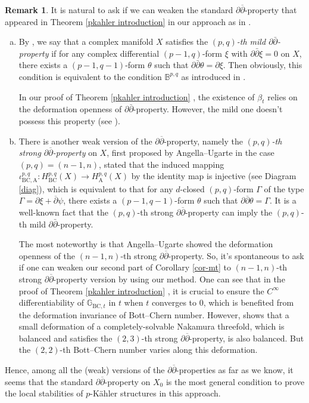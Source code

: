 \documentclass[12pt]{amsart}
\numberwithin{equation}{section}
\theoremstyle{definition}
\theoremstyle{definition}
\theoremstyle{definition}
\newtheorem{remark}  [theorem]     {Remark}
\renewcommand{\1}{\mathsf{1}}
\newcommand{\G}{\mathbb{G}}
\newcommand{\db}{\overline{\partial}}
\renewcommand{\>}{\rightarrow}
\newcommand{\p}{\partial}
\newcommand{\bp}{\overline\partial}
\def\p{\partial}
\def\b{\bar}
\theoremstyle{plain} %
\theoremstyle{plain} %
\theoremstyle{plain} %
\begin{document}
	\begin{remark}\label{weaken remark}
		It is natural to ask if we can weaken the standard $\p\bp$-property  that appeared in Theorem \ref{pkahler introduction}  in our approach as in \cite[Theorem 1.1]{RWZ19}.
		
		\begin{enumerate}[(a)]
			\item By \cite[Definition 3.1]{RWZ19},  we say that a complex manifold $X$ satisfies the  \textit{$(p,q)$-th mild $\p\b{\p}$-property} if for any complex differential $(p-1,q)$-form $\xi$ with $\p\b{\p}\xi=0$ on $X$, there exists a $(p-1,q-1)$-form $\theta$ such that $\p\b{\p}\theta=\p\xi$. Then obviously,  this condition is equivalent to the condition $\mathbb B^{p,q}$ as introduced in \cite[Notation 3.5]{RZ18}.
			
			In our proof of Theorem \ref{pkahler introduction} , the existence
			of $\beta_t$ relies on the deformation openness of $\p\bar{\partial}$-property. However, the mild one doesn't possess this property (see \cite[Example 3.7]{UV15}).
			\item 	There is another weak version of the $\p\bp$-property, namely  the \textit {$(p,q)$-th strong $\p\db$-property} on $X$, first proposed by
			Angella--Ugarte \cite{AU17}  in the case $(p,q)=(n-1,n)$, stated that the induced mapping
			$\iota^{p,q}_{\mathrm {BC},\mathrm A}: H^{p,q}_{\mathrm {BC}}(X) \rightarrow
			H^{p,q}_{\mathrm A}(X)$ by the identity map is injective (see Diagram \eqref{diag}), which
			is equivalent to that for any $d$-closed $(p,q)$-form $\Gamma$ of
			the type $\Gamma=\p\xi+\db \psi$, there exists a $(p-1,q-1)$-form
			$\theta$ such that
		$\p \db \theta = \Gamma.$
			It is a well-known fact that the $(p,q)$-th strong $\p\db$-property can imply the $(p,q)$-th mild $\p\b{\p}$-property.
			
			The most noteworthy is that
			Angella--Ugarte \cite[Proposition 4.8]{AU17} showed the deformation
			openness of the $(n-1,n)$-th strong $\p\db$-property. So, it's spontaneous to ask if one can weaken our second part of Corollary \ref{cor-mt} to $(n-1,n)$-th strong $\p\db$-property version by using our method.
			One can see that in the proof of Theorem \ref{pkahler introduction} , it is crucial to ensure the $C^{\infty}$  differentiability of $\G_{\mathrm {BC},t}$  in $t$ when $t$ converges  to 0, which is benefited from the  deformation invariance of Bott--Chern number.  However, \cite[Example 4.10]{AU17} shows that a small
			deformation of a completely-solvable Nakamura threefold, which is
			balanced and satisfies the $(2,3)$-th strong $\p\db$-property, is also
			balanced. But the $(2,2)$-th Bott--Chern number varies along this
			deformation.
		\end{enumerate}
		
		Hence, among all the (weak) versions of the $\p\bp$-properties as far as we know, it seems that the standard $\p\bp$-property on $X_0$ is the most general condition to prove the local stabilities of $p$-K\"{a}hler structures in this approach.
	\end{remark}
	
\end{document}
